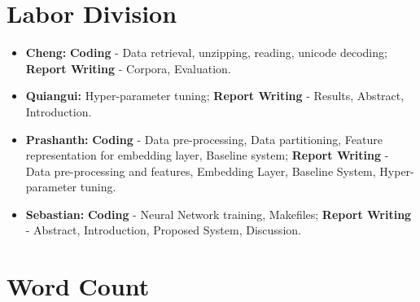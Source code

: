 \documentclass[12pt]{article}
\begin{document}
 


\newpage
\section{Labor Division}
\begin{itemize}
\item
  \textbf{Cheng:} \textbf{Coding} - Data retrieval, unzipping, reading, unicode decoding; \textbf{Report Writing} - Corpora, Evaluation.
\item
  \textbf{Quiangui:} Hyper-parameter tuning; \textbf{Report Writing} - Results, Abstract, Introduction.
\item
  \textbf{Prashanth:} \textbf{Coding} - Data pre-processing, Data partitioning,  Feature representation for embedding layer, Baseline system; \textbf{Report Writing} - Data pre-processing and features, Embedding Layer, Baseline System, Hyper-parameter tuning.
\item
  \textbf{Sebastian:} \textbf{Coding} - Neural Network training, Makefiles; \textbf{Report Writing} - Abstract, Introduction, Proposed System, Discussion.
\end{itemize}
\section{Word Count}
\end{document}
